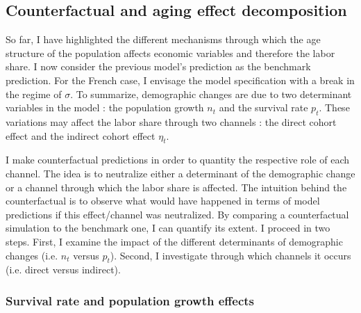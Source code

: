 \subsection{Counterfactual and aging effect decomposition} \label{subsec:counterfactual}

So far, I have highlighted the different mechanisms through which the age structure of the population affects economic variables and therefore the labor share. I now consider the previous model's prediction as the benchmark prediction. For the French case, I envisage the model specification with a break in the regime of $\sigma$. To summarize, demographic changes are due to two determinant variables in the model : the population growth $n_t$ and the survival rate $p_t$. These variations may affect the labor share through two channels : the direct cohort effect and the indirect cohort effect $\eta_t$.

I make counterfactual predictions in order to quantity the respective role of each channel. The idea is to neutralize either a determinant of the demographic change or a channel through which the labor share is affected. The intuition behind the counterfactual is to observe what would have happened in terms of model predictions if this effect/channel was neutralized. By comparing a counterfactual simulation to the benchmark one, I can quantify its extent. I proceed in two steps. First, I examine the impact of the different determinants of demographic changes (i.e. $n_t$ versus $p_t$). Second, I investigate through which channels it occurs (i.e. direct versus indirect).

\subsubsection{Survival rate and population growth effects}

